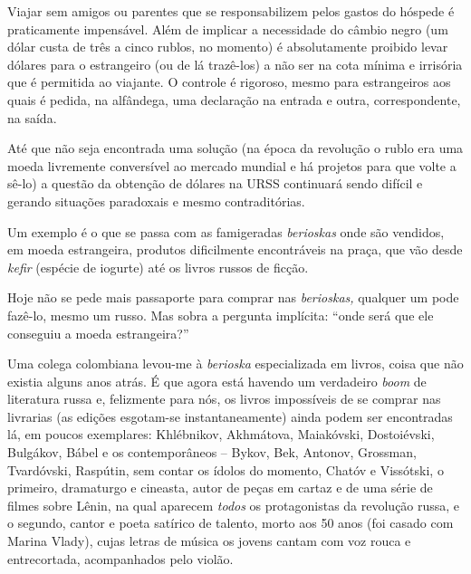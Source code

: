 Viajar sem amigos ou parentes que se responsabilizem pelos gastos do
hóspede é praticamente impensável. Além de implicar a necessidade do
câmbio negro (um dólar custa de três a cinco rublos, no momento) é
absolutamente proibido levar dólares para o estrangeiro (ou de lá
trazê-los) a não ser na cota mínima e irrisória que é permitida ao
viajante. O controle é rigoroso, mesmo para estrangeiros aos quais é
pedida, na alfândega, uma declaração na entrada e outra, correspondente,
na saída.

Até que não seja encontrada uma solução (na época da revolução o rublo
era uma moeda livremente conversível ao mercado mundial e há projetos
para que volte a sê-lo) a questão da obtenção de dólares na URSS
continuará sendo difícil e gerando situações paradoxais e mesmo
contraditórias.

Um exemplo é o que se passa com as famigeradas \emph{berioskas} onde são
vendidos, em moeda estrangeira, produtos dificilmente encontráveis na
praça, que vão desde \emph{kefir} (espécie de iogurte) até os livros
russos de ficção.

Hoje não se pede mais passaporte para comprar nas \emph{berioskas,}
qualquer um pode fazê-lo, mesmo um russo. Mas sobra a pergunta
implícita: ``onde será que ele conseguiu a moeda estrangeira?''

Uma colega colombiana levou-me à \emph{berioska} especializada em
livros, coisa que não existia alguns anos atrás. É que agora está
havendo um verdadeiro \emph{boom} de literatura russa e, felizmente para
nós, os livros impossíveis de se comprar nas livrarias (as edições
esgotam-se instantaneamente) ainda podem ser encontradas lá, em poucos
exemplares: Khlébnikov, Akhmátova, Maiakóvski, Dostoiévski, Bulgákov,
Bábel e os contemporâneos -- Bykov, Bek, Antonov, Grossman, Tvardóvski,
Raspútin, sem contar os ídolos do momento, Chatóv e Vissótski, o
primeiro, dramaturgo e cineasta, autor de peças em cartaz e de uma série
de filmes sobre Lênin, na qual aparecem \emph{todos} os protagonistas da
revolução russa, e o segundo, cantor e poeta satírico de talento, morto
aos 50 anos (foi casado com Marina Vlady), cujas letras de música os
jovens cantam com voz rouca e entrecortada, acompanhados pelo violão.

